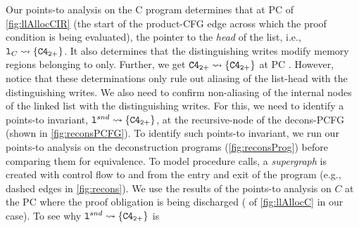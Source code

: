 \vspace{-5px}
Our points-to analysis on
the C program determines that at PC  of \cref{fig:llAllocCIR} (the start of
the product-CFG edge  across which the proof
condition is being evaluated), the pointer to the {\em head}
of the list, i.e., ${\tt l}_{C} \rightsquigarrow{} \{ {\tt C4_{2+}} \}$.
It also determines that the distinguishing
writes modify memory regions belonging to  only.
Further, we get ${\tt C4_{2+}} \rightsquigarrow{} \{ {\tt C4_{2+}} \}$ at PC .
However, notice that these determinations only rule out aliasing of the list-head with
the distinguishing writes. We also need to confirm non-aliasing
of the internal nodes of the linked list with the distinguishing writes.
For this, we need to identify a points-to invariant,
${\tt l}^{snd} \rightsquigarrow{} \{ {\tt C4_{2+}} \}$, at the recursive-node
of the decons-PCFG (shown in \cref{fig:reconsPCFG}).
To identify such points-to invariant, we run our points-to analysis
on the deconstruction programs (\cref{fig:reconsProg}) before comparing them for equivalence.
To model procedure calls, a {\em supergraph} is created with control flow to and from the entry and exit
of the program (e.g., dashed edges in \cref{fig:recons}).
We use the results of the points-to analysis on $C$ at the PC where the proof obligation
is being discharged ( of \cref{fig:llAllocC} in our case).
To see why ${\tt l}^{snd} \rightsquigarrow{} \{ {\tt C4_{2+}} \}$ is
